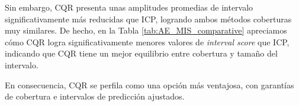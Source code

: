 Sin embargo, CQR presenta unas amplitudes promedias de intervalo significativamente más reducidas que ICP, 
logrando ambos métodos coberturas muy similares. De hecho, en la Tabla \ref{tab:AE_MIS_comparative} apreciamos
cómo CQR logra significativamente menores valores de \textit{interval score} que ICP, indicando que
CQR tiene un mejor equilibrio entre cobertura y tamaño del intervalo.

En consecuencia, CQR se perfila como una opción más ventajosa, con garantías de cobertura e intervalos de 
predicción ajustados. 


